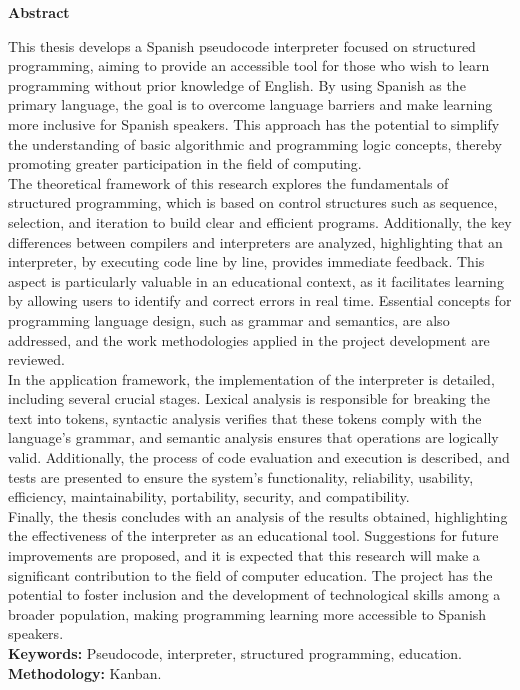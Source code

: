 \begin{spacing}{1.5}
  \begin{center}
    \Large \textbf{Abstract}
  \end{center}
  This thesis develops a Spanish pseudocode interpreter focused on structured programming, aiming to provide an accessible tool for those who wish to learn programming without prior knowledge of English. By using Spanish as the primary language, the goal is to overcome language barriers and make learning more inclusive for Spanish speakers. This approach has the potential to simplify the understanding of basic algorithmic and programming logic concepts, thereby promoting greater participation in the field of computing. \\
  The theoretical framework of this research explores the fundamentals of structured programming, which is based on control structures such as sequence, selection, and iteration to build clear and efficient programs. Additionally, the key differences between compilers and interpreters are analyzed, highlighting that an interpreter, by executing code line by line, provides immediate feedback. This aspect is particularly valuable in an educational context, as it facilitates learning by allowing users to identify and correct errors in real time. Essential concepts for programming language design, such as grammar and semantics, are also addressed, and the work methodologies applied in the project development are reviewed. \\
  In the application framework, the implementation of the interpreter is detailed, including several crucial stages. Lexical analysis is responsible for breaking the text into tokens, syntactic analysis verifies that these tokens comply with the language's grammar, and semantic analysis ensures that operations are logically valid. Additionally, the process of code evaluation and execution is described, and tests are presented to ensure the system's functionality, reliability, usability, efficiency, maintainability, portability, security, and compatibility. \\
  Finally, the thesis concludes with an analysis of the results obtained, highlighting the effectiveness of the interpreter as an educational tool. Suggestions for future improvements are proposed, and it is expected that this research will make a significant contribution to the field of computer education. The project has the potential to foster inclusion and the development of technological skills among a broader population, making programming learning more accessible to Spanish speakers. \\
  \textbf{Keywords:} Pseudocode, interpreter, structured programming, education. \\
  \textbf{Methodology:} Kanban.
\end{spacing}